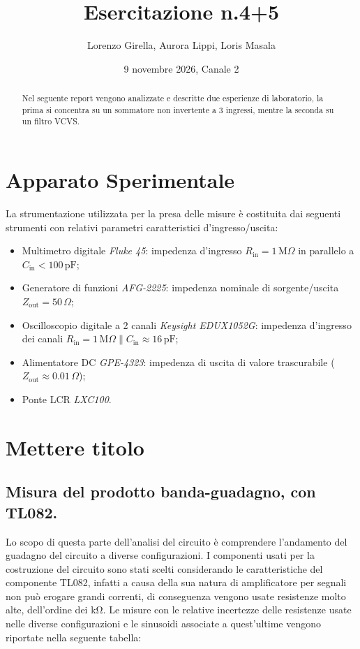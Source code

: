 \documentclass{article}
\title{Esercitazione n.4+5}
\author{Lorenzo Girella, Aurora Lippi, Loris Masala}
\date{9 novembre 2026, Canale 2}
\begin{document}
\maketitle
\begin{abstract}
Nel seguente report vengono analizzate e descritte due esperienze di laboratorio, la prima si concentra su un sommatore non invertente a 3 ingressi, mentre la seconda su un filtro VCVS.
\end{abstract}

\tableofcontents

\section{Apparato Sperimentale}
La strumentazione utilizzata per la presa delle misure è costituita dai seguenti strumenti con relativi parametri caratteristici d'ingresso/uscita:
\begin{itemize}
    \item Multimetro digitale \textit{Fluke 45}: impedenza d'ingresso $R_{\text{in}} = 1\,\text{M}\Omega$ in parallelo a $C_{\text{in}} < 100\,\text{pF}$;
    \item Generatore di funzioni \textit{AFG-2225}: impedenza nominale di sorgente/uscita $Z_{\text{out}} = 50\,\Omega$;
    \item Oscilloscopio digitale a 2 canali \textit{Keysight EDUX1052G}: impedenza d'ingresso dei canali $R_{\text{in}} = 1\,\text{M}\Omega \parallel C_{\text{in}} \approx 16\,\text{pF}$;
    \item Alimentatore DC \textit{GPE-4323}: impedenza di uscita di valore trascurabile ($Z_{\text{out}} \approx 0.01\,\Omega$);
    \item Ponte LCR \textit{LXC100}.
\end{itemize}

\section{Mettere titolo}
\subsection{Misura del prodotto banda-guadagno, con TL082.}
Lo scopo di questa parte dell'analisi del circuito è comprendere l'andamento del guadagno del circuito a diverse configurazioni.
I componenti usati per la costruzione del circuito sono stati scelti considerando le caratteristiche del componente TL082, infatti a causa della sua natura di amplificatore per segnali non può erogare grandi correnti, di conseguenza vengono usate resistenze molto alte, dell'ordine dei \si{\kilo\ohm}.
Le misure con le relative incertezze delle resistenze usate nelle diverse configurazioni e le sinusoidi associate a quest'ultime vengono riportate nella seguente tabella:
\end{document}
